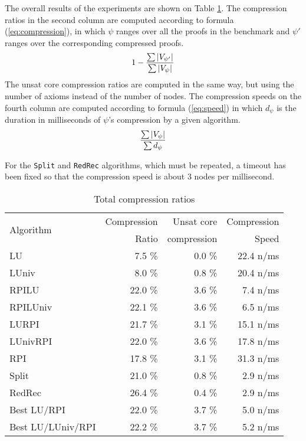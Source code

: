 \documentclass{llncs}
\begin{document}
The overall results of the experiments are shown on Table \ref{tab:average}. The compression ratios
in the second column are computed according to formula (\ref{eq:compression}), in which $\psi$
ranges over all the proofs in the benchmark and $\psi'$ ranges over the corresponding compressed
proofs.
\begin{equation} \label{eq:compression}
  1 - \frac{ \sum {|V_{\psi'}|} }{ \sum {|V_{\psi}|} }
\end{equation}
The unsat core compression ratios are computed in the same way, but using the number of axioms instead of
the number of nodes. The compression speeds on the fourth column are computed according to formula
(\ref{eq:speed}) in which $d_{\psi}$ is the duration in milliseconds of $\psi$'s compression by a
given algorithm.
\begin{equation} \label{eq:speed}
  \frac{ \sum {|V_{\psi}|} }{ \sum {d_{\psi}} }
\end{equation}

For the \texttt{Split} and \texttt{RedRec} algorithms, which must be repeated, a timeout has
been fixed so that the compression speed is about 3 nodes per millisecond. 


\begin{table}[tb]
  \caption{Total compression ratios}
  \label{tab:average}
  \centering
  \begin{tabular}{lrrr}
    \toprule
    \multirow{2}{*}{Algorithm} & Compression & Unsat core  & Compression \\
                               &       Ratio & compression &       Speed \\
    \midrule
    LU                &  7.5 \% &  0.0 \% & 22.4 n/ms \\
    LUniv             &  8.0 \% &  0.8 \% & 20.4 n/ms \\
    RPILU             & 22.0 \% &  3.6 \% &  7.4 n/ms \\
    RPILUniv          & 22.1 \% &  3.6 \% &  6.5 n/ms \\
    LURPI             & 21.7 \% &  3.1 \% & 15.1 n/ms \\
    LUnivRPI          & 22.0 \% &  3.6 \% & 17.8 n/ms \\
    RPI               & 17.8 \% &  3.1 \% & 31.3 n/ms \\
    Split             & 21.0 \% &  0.8 \% &  2.9 n/ms \\
    RedRec           & 26.4 \% &  0.4 \% &  2.9 n/ms \\
    Best LU/RPI       & 22.0 \% &  3.7 \% &  5.0 n/ms \\
    Best LU/LUniv/RPI & 22.2 \% &  3.7 \% &  5.2 n/ms \\
    \bottomrule
  \end{tabular}
\end{table}
\end{document}
